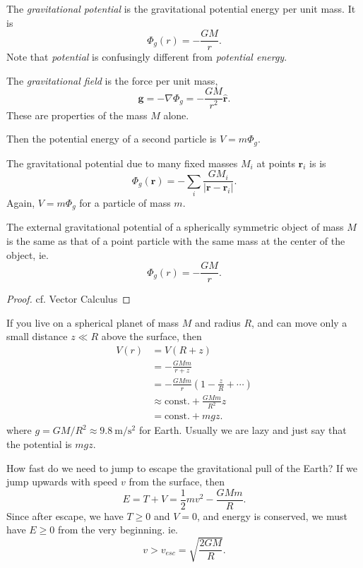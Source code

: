 \documentclass[a4paper]{article}
\begin{document}
\begin{defi}
  The \emph{gravitational potential} is the gravitational potential energy per unit mass. It is
  \[
    \Phi_g(r) = -\frac{GM}{r}.
  \]
  Note that \emph{potential} is confusingly different from \emph{potential energy}.

  The \emph{gravitational field} is the force per unit mass,
  \[
    \mathbf{g} = -\nabla \Phi_g = -\frac{GM}{r^2}\hat{\mathbf{r}}.
  \]
  These are properties of the mass $M$ alone.

  Then the potential energy of a second particle is $V = m\Phi_g$.
\end{defi}

\begin{prop}
  The gravitational potential due to many fixed masses $M_i$ at points $\mathbf{r}_i$ is is
  \[
    \Phi_g(\mathbf{r}) = -\sum_i \frac{GM_i}{|\mathbf{r} - \mathbf{r}_i|}.
  \]
  Again, $V = m\Phi_g$ for a particle of mass $m$.
\end{prop}

\begin{prop}
  The external gravitational potential of a spherically symmetric object of mass $M$ is the same as that of a point particle with the same mass at the center of the object, ie.
  \[
    \Phi_g(r) = -\frac{GM}{r}.
  \]
\end{prop}

\begin{proof}
  cf. Vector Calculus
\end{proof}

\begin{eg}
  If you live on a spherical planet of mass $M$ and radius $R$, and can move only a small distance $z \ll R$ above the surface, then
  \begin{align*}
    V(r) &= V(R + z)\\
    &= -\frac{GMm}{r + z}\\
    &= -\frac{GMm}{r}\left(1 - \frac{z}{R} + \cdots\right)\\
    &\approx \text{const.} + \frac{GMm}{R^2}z\\
    &= \text{const.} + mgz.
  \end{align*}
  where $g = GM/R^2 \approx \SI{9.8}{\meter\per\second\squared}$ for Earth. Usually we are lazy and just say that the potential is $mgz$.
\end{eg}

\begin{eg}
  How fast do we need to jump to escape the gravitational pull of the Earth? If we jump upwards with speed $v$ from the surface, then
  \[
    E = T + V = \frac{1}{2}mv^2 - \frac{GMm}{R}.
  \]
  Since after escape, we have $T \geq 0$ and $V = 0$, and energy is conserved, we must have $E \geq 0$ from the very beginning. ie.
  \[
    v > v_{esc} = \sqrt{\frac{2GM}{R}}.
  \]
\end{eg}
\end{document}
